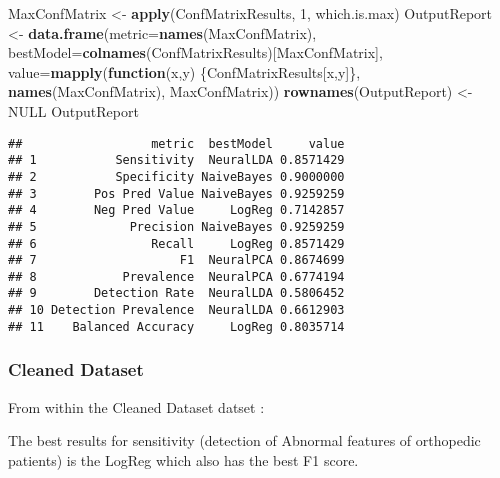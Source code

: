\documentclass[
]{article}
\newenvironment{Shaded}{\begin{snugshade}}{\end{snugshade}}
\newcommand{\ControlFlowTok}[1]{\textcolor[rgb]{0.13,0.29,0.53}{\textbf{#1}}}
\newcommand{\DataTypeTok}[1]{\textcolor[rgb]{0.13,0.29,0.53}{#1}}
\newcommand{\DecValTok}[1]{\textcolor[rgb]{0.00,0.00,0.81}{#1}}
\newcommand{\KeywordTok}[1]{\textcolor[rgb]{0.13,0.29,0.53}{\textbf{#1}}}
\newcommand{\NormalTok}[1]{#1}
\newcommand{\OtherTok}[1]{\textcolor[rgb]{0.56,0.35,0.01}{#1}}
\newcommand{\StringTok}[1]{\textcolor[rgb]{0.31,0.60,0.02}{#1}}
\begin{document}
\begin{Shaded}
\begin{Highlighting}[]
\NormalTok{MaxConfMatrix <-}\StringTok{ }\KeywordTok{apply}\NormalTok{(ConfMatrixResults, }\DecValTok{1}\NormalTok{, which.is.max)}
\NormalTok{OutputReport <-}\StringTok{ }\KeywordTok{data.frame}\NormalTok{(}\DataTypeTok{metric=}\KeywordTok{names}\NormalTok{(MaxConfMatrix), }
                            \DataTypeTok{bestModel=}\KeywordTok{colnames}\NormalTok{(ConfMatrixResults)[MaxConfMatrix],}
                            \DataTypeTok{value=}\KeywordTok{mapply}\NormalTok{(}\ControlFlowTok{function}\NormalTok{(x,y) \{ConfMatrixResults[x,y]\}, }
                                         \KeywordTok{names}\NormalTok{(MaxConfMatrix), }
\NormalTok{                                         MaxConfMatrix))}
\KeywordTok{rownames}\NormalTok{(OutputReport) <-}\StringTok{ }\OtherTok{NULL}
\NormalTok{OutputReport}
\end{Highlighting}
\end{Shaded}

\begin{verbatim}
##                  metric  bestModel     value
## 1           Sensitivity  NeuralLDA 0.8571429
## 2           Specificity NaiveBayes 0.9000000
## 3        Pos Pred Value NaiveBayes 0.9259259
## 4        Neg Pred Value     LogReg 0.7142857
## 5             Precision NaiveBayes 0.9259259
## 6                Recall     LogReg 0.8571429
## 7                    F1  NeuralPCA 0.8674699
## 8            Prevalence  NeuralPCA 0.6774194
## 9        Detection Rate  NeuralLDA 0.5806452
## 10 Detection Prevalence  NeuralLDA 0.6612903
## 11    Balanced Accuracy     LogReg 0.8035714
\end{verbatim}

\hypertarget{cleaned-dataset-8}{%
\subsubsection{Cleaned Dataset}\label{cleaned-dataset-8}}

From within the Cleaned Dataset datset :

The best results for sensitivity (detection of Abnormal features of
orthopedic patients) is the LogReg which also has the best F1 score.
\end{document}
